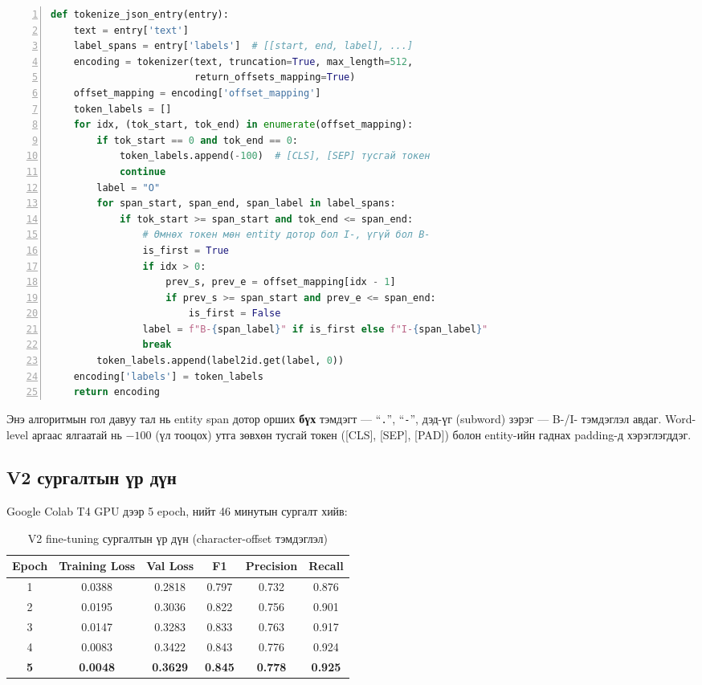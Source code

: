 \begin{lstlisting}[language=Python, caption={Character-offset tokenization тааруулга}, basicstyle=\small\ttfamily, breaklines=true, frame=single, numbers=left]
def tokenize_json_entry(entry):
    text = entry['text']
    label_spans = entry['labels']  # [[start, end, label], ...]
    encoding = tokenizer(text, truncation=True, max_length=512,
                         return_offsets_mapping=True)
    offset_mapping = encoding['offset_mapping']
    token_labels = []
    for idx, (tok_start, tok_end) in enumerate(offset_mapping):
        if tok_start == 0 and tok_end == 0:
            token_labels.append(-100)  # [CLS], [SEP] тусгай токен
            continue
        label = "O"
        for span_start, span_end, span_label in label_spans:
            if tok_start >= span_start and tok_end <= span_end:
                # Өмнөх токен мөн entity дотор бол I-, үгүй бол B-
                is_first = True
                if idx > 0:
                    prev_s, prev_e = offset_mapping[idx - 1]
                    if prev_s >= span_start and prev_e <= span_end:
                        is_first = False
                label = f"B-{span_label}" if is_first else f"I-{span_label}"
                break
        token_labels.append(label2id.get(label, 0))
    encoding['labels'] = token_labels
    return encoding
\end{lstlisting}

Энэ алгоритмын гол давуу тал нь entity span дотор орших \textbf{бүх} тэмдэгт — ``\texttt{.}'', ``\texttt{-}'', дэд-үг (subword) зэрэг — B-/I- тэмдэглэл авдаг. Word-level аргаас ялгаатай нь $-100$ (үл тооцох) утга зөвхөн тусгай токен ([CLS], [SEP], [PAD]) болон entity-ийн гаднах padding-д хэрэглэгддэг.

\subsection{V2 сургалтын үр дүн}

Google Colab T4 GPU дээр 5 epoch, нийт 46 минутын сургалт хийв:

\begin{table}[h!]
\centering
\renewcommand{\arraystretch}{1.4}
\begin{tabular}{|c|c|c|c|c|c|}
\hline
\textbf{Epoch} & \textbf{Training Loss} & \textbf{Val Loss} & \textbf{F1} & \textbf{Precision} & \textbf{Recall} \\ \hline
1 & 0.0388 & 0.2818 & 0.797 & 0.732 & 0.876 \\ \hline
2 & 0.0195 & 0.3036 & 0.822 & 0.756 & 0.901 \\ \hline
3 & 0.0147 & 0.3283 & 0.833 & 0.763 & 0.917 \\ \hline
4 & 0.0083 & 0.3422 & 0.843 & 0.776 & 0.924 \\ \hline
\textbf{5} & \textbf{0.0048} & \textbf{0.3629} & \textbf{0.845} & \textbf{0.778} & \textbf{0.925} \\ \hline
\end{tabular}
\caption{V2 fine-tuning сургалтын үр дүн (character-offset тэмдэглэл)}
\label{tab:v2_training}
\end{table}

